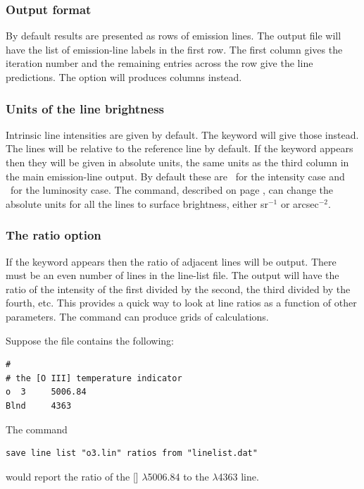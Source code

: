 \subsubsection{Output format}
By default results are presented as rows of emission lines.
The output file will have the list of emission-line labels in the first
row.  The first column gives the iteration number and the remaining
entries across the row give the line predictions.
The  option will produces columns instead.

\subsubsection{Units of the line brightness}
Intrinsic line intensities are given by default.
The keyword  will give those instead.
The lines will be relative to the reference line by default.
If the keyword  appears then they will be given
in absolute units, the same units as the third column in
the main emission-line output.
By default these are \ergpscmps\
for the intensity case and \ergps\ for the luminosity case.
The  command,
described on page \pageref{sec:CommandPrintLineSurfaceBrightness},
can change the absolute units for all the lines to surface brightness,
either sr$^{-1}$ or arcsec$^{-2}$.

\subsubsection{The ratio option}
If the keyword  appears then the ratio of adjacent
lines will be output.
There must be an even number of lines in the line-list file.
The output will have the ratio of the intensity of the first divided
by the second, the third divided by the fourth, etc.
This provides a quick way to look at line ratios as a function
of other parameters.
The  command can produce grids of calculations.

Suppose the file  contains the following:
\begin{verbatim}
#
# the [O III] temperature indicator
o  3     5006.84
Blnd     4363
\end{verbatim}
The command
\begin{verbatim}
save line list "o3.lin" ratios from "linelist.dat"
\end{verbatim}
would report the ratio of the [\oiii] $\lambda$5006.84 to the $\lambda$4363 line.

